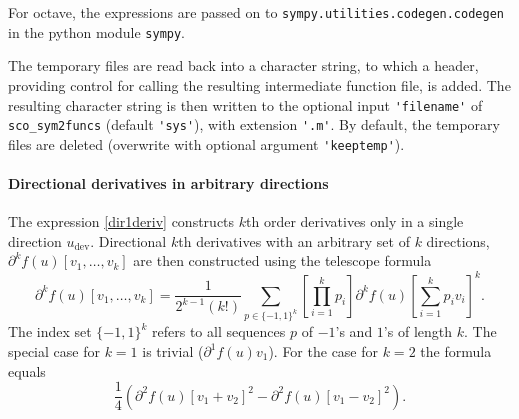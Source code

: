 \documentclass[11pt]{scrartcl}
\newcommand{\blist}[1]{\mbox{\lstinline!#1!}}
\begin{document}
\begin{compactenum}
  For octave, the expressions are passed on to
  \blist{sympy.utilities.codegen.codegen} in the python module
  \blist{sympy}.
\item The temporary files are read back into a character string, to
  which a header, providing control for calling the resulting
  intermediate function file, is added. The resulting character string
  is then written to the optional input \blist{'filename'} of
  \blist{sco_sym2funcs} (default \blist{'sys'}), with extension
  \blist{'.m'}. By default, the temporary files are deleted (overwrite
  with optional argument \blist{'keeptemp'}).
\end{compactenum}

\paragraph{Directional derivatives in arbitrary directions}
The expression \eqref{dir1deriv} constructs $k$th order derivatives
only in a single direction $u_\mathrm{dev}$. Directional $k$th
derivatives with an arbitrary set of $k$ directions,
$\partial^kf(u)[v_1,\ldots,v_k]$ are then constructed using the
telescope formula
\begin{displaymath}
  \partial^kf(u)[v_1,\ldots,v_k]=
  \frac{1}{2^{k-1}(k!)}\sum_{p\in \{-1,1\}^k}\left[\prod_{i=1}^kp_i\right]\partial^kf(u)\left[\sum_{i=1}^k p_iv_i\right]^k\mbox{.}
\end{displaymath}
The index set $\{-1,1\}^k$ refers to all sequences $p$ of $-1$'s and
$1$'s of length $k$. The special case for $k=1$ is trivial
($\partial^1f(u)v_1$). For the case for $k=2$ the formula equals
\begin{displaymath}
  \frac{1}{4}\left(\partial^2f(u)[v_1+v_2]^2-\partial^2f(u)[v_1-v_2]^2\right)\mbox{.}
\end{displaymath}
\end{document}
